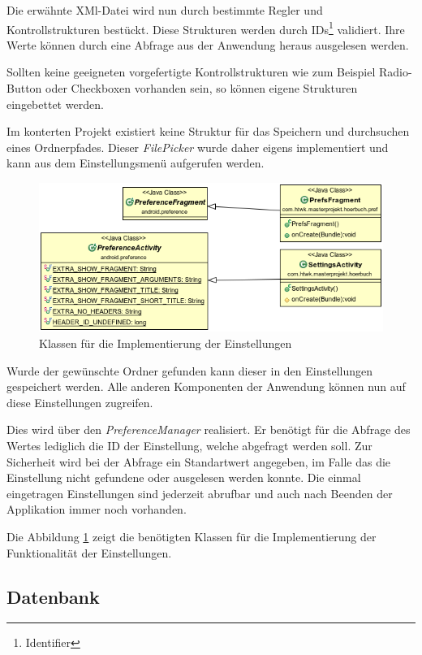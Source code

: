 Die erwähnte XMl-Datei wird nun durch bestimmte Regler und Kontrollstrukturen bestückt. Diese Strukturen werden durch IDs\footnote{Identifier} validiert. Ihre Werte können durch eine Abfrage aus der Anwendung heraus ausgelesen werden.

Sollten keine geeigneten vorgefertigte Kontrollstrukturen wie zum Beispiel Radio-Button oder Checkboxen vorhanden sein, so können eigene Strukturen eingebettet werden.

Im konterten Projekt existiert keine Struktur für das Speichern und durchsuchen eines Ordnerpfades. Dieser \textit{FilePicker} wurde daher eigens implementiert und kann aus dem Einstellungsmenü aufgerufen werden.

\begin{center}
\begin{figure}
\includegraphics[scale=0.7]{images/settings}
\caption{Klassen für die Implementierung der Einstellungen}
\label{settings}
\end{figure}
\end{center}

Wurde der gewünschte Ordner gefunden kann dieser in den Einstellungen gespeichert werden. Alle anderen Komponenten der Anwendung können nun auf diese Einstellungen zugreifen.

Dies wird über den \textit{PreferenceManager} realisiert. Er benötigt für die Abfrage des Wertes lediglich die ID der Einstellung, welche abgefragt werden soll. Zur Sicherheit wird bei der Abfrage ein Standartwert angegeben, im Falle das die Einstellung nicht gefundene oder ausgelesen werden konnte. Die einmal eingetragen Einstellungen sind jederzeit abrufbar und auch nach Beenden der Applikation immer noch vorhanden.

Die Abbildung \ref{settings} zeigt die benötigten Klassen für die Implementierung der Funktionalität der Einstellungen.


\subsection{Datenbank}
